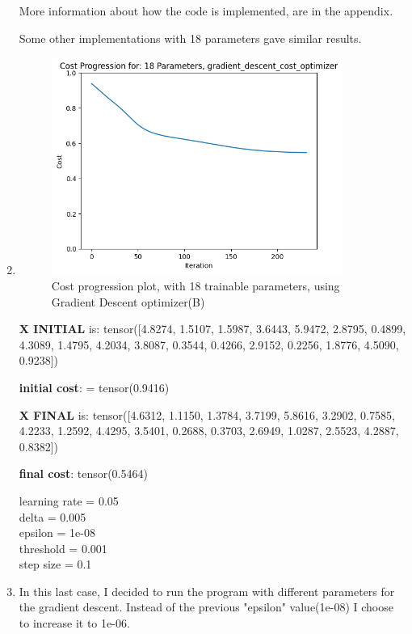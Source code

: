 \documentclass[inscr,ack,preface]{diphdthesis}
\begin{document}
\begin{enumerate}[label=\textbf{\Alph*.}]
More information about how the code is implemented, are in the appendix.

Some other implementations with 18 parameters gave similar results.

\item \textbf{ }
\begin{figure}[H]
\begin{center}
    \includegraphics[width=0.9\textwidth]{18.png}
    \caption{Cost progression plot, with 18 trainable parameters, using Gradient Descent optimizer(B)} 
    \label{fig:enter-label}
    \end{center}
\end{figure}

\textbf{X INITIAL} is: tensor([4.8274, 1.5107, 1.5987, 3.6443, 5.9472, 2.8795, 0.4899, 4.3089, 1.4795,
        4.2034, 3.8087, 0.3544, 0.4266, 2.9152, 0.2256, 1.8776, 4.5090, 0.9238])
        
\textbf{initial cost}: = tensor(0.9416)

\textbf{X FINAL} is: tensor([4.6312, 1.1150, 1.3784, 3.7199, 5.8616, 3.2902, 0.7585, 4.2233, 1.2592,
        4.4295, 3.5401, 0.2688, 0.3703, 2.6949, 1.0287, 2.5523, 4.2887, 0.8382])
        
\textbf{final cost}: tensor(0.5464)

learning rate =  0.05 \\
delta =  0.005 \\
epsilon =  1e-08 \\
threshold =  0.001 \\
step size =  0.1 \\

\item \textbf{ }
In this last case, I decided to run the program with different parameters for the gradient descent. Instead of the previous "epsilon" value(1e-08) I choose to increase it to 1e-06.


\end{enumerate}
\end{document}
